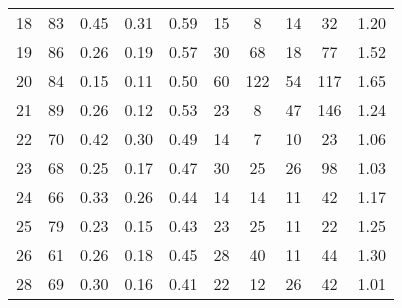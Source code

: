 \begin{tabular}{lccccccccc}
18 &       83 &                             0.45 &                             0.31 &                             0.59 &              15 &               8 &                                 14 &                              32 &       1.20 \\
19 &       86 &                             0.26 &                             0.19 &                             0.57 &              30 &              68 &                                 18 &                              77 &       1.52 \\
20 &       84 &                             0.15 &                             0.11 &                             0.50 &              60 &             122 &                                 54 &                             117 &       1.65 \\
21 &       89 &                             0.26 &                             0.12 &                             0.53 &              23 &               8 &                                 47 &                             146 &       1.24 \\
22 &       70 &                             0.42 &                             0.30 &                             0.49 &              14 &               7 &                                 10 &                              23 &       1.06 \\
23 &       68 &                             0.25 &                             0.17 &                             0.47 &              30 &              25 &                                 26 &                              98 &       1.03 \\
24 &       66 &                             0.33 &                             0.26 &                             0.44 &              14 &              14 &                                 11 &                              42 &       1.17 \\
25 &       79 &                             0.23 &                             0.15 &                             0.43 &              23 &              25 &                                 11 &                              22 &       1.25 \\
26 &       61 &                             0.26 &                             0.18 &                             0.45 &              28 &              40 &                                 11 &                              44 &       1.30 \\
28 &       69 &                             0.30 &                             0.16 &                             0.41 &              22 &              12 &                                 26 &                              42 &       1.01 \\

\end{tabular}
